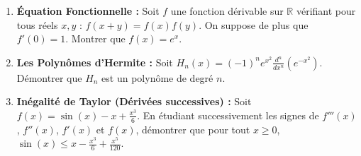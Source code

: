 \documentclass[10pt, a4paper]{article}
\begin{document}
\begin{enumerate}
    \item \textbf{Équation Fonctionnelle :} Soit $f$ une fonction dérivable sur $\mathbb{R}$ vérifiant pour tous réels $x, y$ : $f(x+y) = f(x)f(y)$. On suppose de plus que $f'(0) = 1$. Montrer que $f(x) = e^x$.
    \item \textbf{Les Polynômes d'Hermite :} Soit $H_n(x) = (-1)^n e^{x^2} \frac{d^n}{dx^n} \left( e^{-x^2} \right)$. Démontrer que $H_n$ est un polynôme de degré $n$.
    \item \textbf{Inégalité de Taylor (Dérivées successives) :} Soit $f(x) = \sin(x) - x + \frac{x^3}{6}$. En étudiant successivement les signes de $f'''(x)$, $f''(x)$, $f'(x)$ et $f(x)$, démontrer que pour tout $x \ge 0$, $\sin(x) \le x - \frac{x^3}{6} + \frac{x^5}{120}$.
\end{enumerate}
\end{document}
